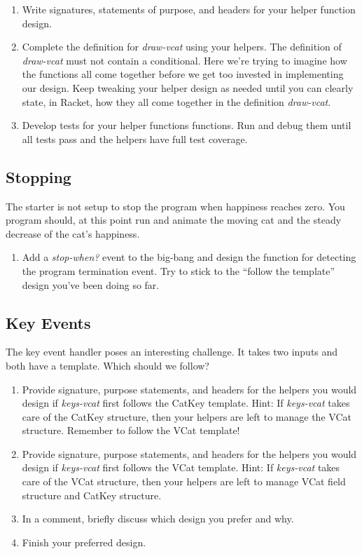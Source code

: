 \documentclass[nobib]{tufte-handout}
\begin{document}
\begin{enumerate}[resume]
  \item Write signatures, statements of purpose, and headers for your helper function design.
  \item Complete the definition for \textit{draw-vcat} using your helpers.  The definition of \textit{draw-vcat} must not contain a conditional. Here we're trying to imagine how the functions all come together before we get too invested in implementing our design. Keep tweaking your helper design as needed until you can clearly state, in Racket, how they all come together in the definition \textit{draw-vcat}.
  \item Develop tests for your helper functions functions. Run and debug them until all tests pass and the helpers have full test coverage.
\end{enumerate}

\subsection*{Stopping}

The starter is not setup to stop the program when happiness reaches zero. You program should, at this point run and animate the moving cat and the steady decrease of the cat's happiness.

\begin{enumerate}[resume]
  \item Add a \textit{stop-when?} event to the big-bang and design the function for detecting the program termination event. Try to stick to the ``follow the template'' design you've been doing so far.
\end{enumerate}

\subsection*{Key Events}

The key event handler poses an interesting challenge. It takes two inputs and both have a template. Which should we follow?
\begin{enumerate}[resume]
  \item Provide signature, purpose statements, and headers for the helpers you would design if \textit{keys-vcat} first follows the CatKey template. Hint: If \textit{keys-vcat} takes care of the CatKey structure, then your helpers are left to manage the VCat structure. Remember to follow the VCat template!
  \item Provide signature, purpose statements, and headers for the helpers you would design if \textit{keys-vcat} first follows the VCat template. Hint: If \textit{keys-vcat} takes care of the VCat structure, then your helpers are left to manage VCat field structure and CatKey structure.
  \item In a comment, briefly discuss which design you prefer and why. 
  \item Finish your preferred design.
\end{enumerate}
\end{document}
